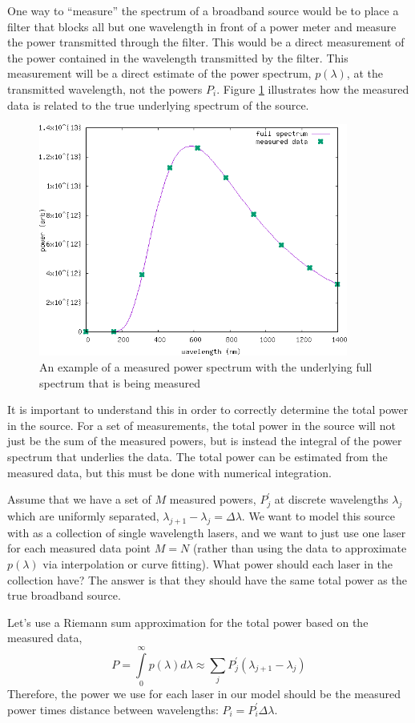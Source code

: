 \documentclass[letterpaper,10pt]{article}
\begin{document}
One way to ``measure'' the spectrum of a broadband source would be to place a filter that blocks all but one wavelength in front of a power meter
and measure the power transmitted through the filter. This would be a direct measurement of the power contained in the wavelength transmitted by the filter.
This measurement will be a direct estimate of the power spectrum, $p(\lambda)$, at the transmitted wavelength, not the powers $P_i$. Figure \ref{fig:spectrum} illustrates
how the measured data is related to the true underlying spectrum of the source.
\begin{figure}
  \includegraphics[width=4in]{spectrum-example.png}
  \caption{\label{fig:spectrum}An example of a measured power spectrum with the underlying full spectrum that is being measured}
\end{figure}
It is important to understand this in order to correctly determine the total power in the source. For a set of measurements, the total power
in the source will not just be the sum of the measured powers, but is instead the integral of the power spectrum that underlies the data. The total
power can be estimated from the measured data, but this must be done with numerical integration.

Assume that we have a set of $M$ measured powers, $P_j^\prime$ at discrete
wavelengths $\lambda_j$ which are uniformly separated, $\lambda_{j+1} -
\lambda_j = \Delta \lambda$. We want to model this source with as a collection
of single wavelength lasers, and we want to just use one laser for each
measured data point $M=N$ (rather than using the data to approximate $p(\lambda)$ via interpolation or curve fitting).
What power should each laser in the collection have? The answer is that they should have the same total power as the true broadband
source.

Let's use a Riemann sum approximation for the total power based on the measured data,
\begin{equation}
  P = \int\limits_{0}^{\infty} p(\lambda) d\lambda \approx \sum_j P_j^\prime (\lambda_{j+1} - \lambda_j)
\end{equation}
Therefore, the power we use for each laser in our model should be the measured power times distance between wavelengths: $P_i = P_i^\prime \Delta \lambda$.
\end{document}
